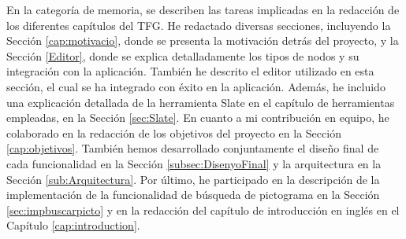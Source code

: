 En la categoría de memoria, se describen las tareas implicadas en la redacción de los diferentes capítulos del TFG. He redactado diversas secciones, incluyendo la Sección \ref{cap:motivacio}, donde se presenta la motivación detrás del proyecto, y la Sección \ref{Editor}, donde se explica detalladamente los tipos de nodos y su integración con la aplicación. También he descrito el editor utilizado en esta sección, el cual se ha integrado con éxito en la aplicación. Además, he incluido una explicación detallada de la herramienta Slate en el capítulo de herramientas empleadas, en la Sección \ref{sec:Slate}. En cuanto a mi contribución en equipo, he colaborado en la redacción de los objetivos del proyecto en la Sección \ref{cap:objetivos}. También hemos desarrollado conjuntamente el diseño final de cada funcionalidad en la Sección \ref{subsec:DisenyoFinal} y la arquitectura en la Sección \ref{sub:Arquitectura}. Por último, he participado en la descripción de la implementación de la funcionalidad de búsqueda de pictograma en la Sección \ref{sec:impbuscarpicto} y en la redacción del capítulo de introducción en inglés en el Capítulo \ref{cap:introduction}.


